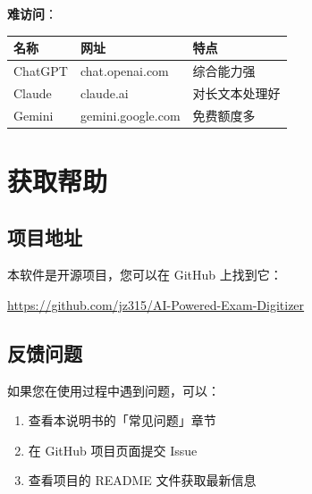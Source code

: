 \documentclass[UTF8,zihao=-4,openany]{ctexbook}
\begin{document}
\textbf{难访问}：
\begin{center}
	\begin{tabular}{llp{5cm}}
		\toprule
		\textbf{名称} & \textbf{网址}       & \textbf{特点} \\
		\midrule
		ChatGPT     & chat.openai.com   & 综合能力强       \\
		Claude      & claude.ai         & 对长文本处理好     \\
		Gemini      & gemini.google.com & 免费额度多       \\
		\bottomrule
	\end{tabular}
\end{center}

\chapter{获取帮助}

\section{项目地址}

本软件是开源项目，您可以在 GitHub 上找到它：

\url{https://github.com/jz315/AI-Powered-Exam-Digitizer}

\section{反馈问题}

如果您在使用过程中遇到问题，可以：

\begin{enumerate}
	\item 查看本说明书的「常见问题」章节
	\item 在 GitHub 项目页面提交 Issue
	\item 查看项目的 README 文件获取最新信息
\end{enumerate}

\backmatter
\end{document}
